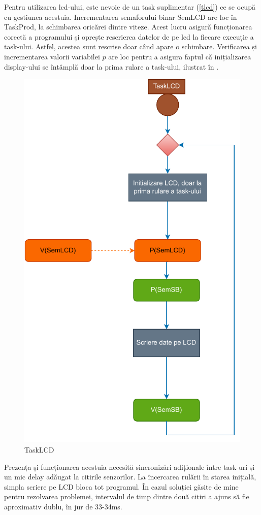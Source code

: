  Pentru utilizarea \gls{lcd}-ului, este nevoie de un task suplimentar (\ref{tlcd}) ce se ocupă cu gestiunea acestuia. Incrementarea semaforului binar SemLCD are loc în TaskProd, la schimbarea oricărei dintre viteze. Acest lucru asigură funcționarea corectă a programului și oprește rescrierea datelor de pe \gls{lcd} la fiecare execuție a task-ului. Astfel, acestea sunt rescrise doar când apare o schimbare. Verificarea și incrementarea valorii variabilei $p$ are loc pentru a asigura faptul că inițializarea display-ului se întâmplă doar la prima rulare a task-ului, ilustrat în .

  \begin{figure}[!ht]
    \begin{center}
    \includegraphics[width=0.6\linewidth,keepaspectratio]{pics/TaskLCD.drawio.pdf}
    \end{center}
    \caption{TaskLCD}
    \label{fig:tasklcd}
\end{figure}

Prezența și funcționarea acestuia necesită sincronizări adiționale între task-uri și un mic delay adăugat la citirile senzorilor. La încercarea rulării în starea inițială, simpla scriere pe LCD bloca tot programul. În cazul soluției găsite de mine pentru rezolvarea problemei, intervalul de timp dintre două citiri a ajuns să fie aproximativ dublu, în jur de 33-34ms.

